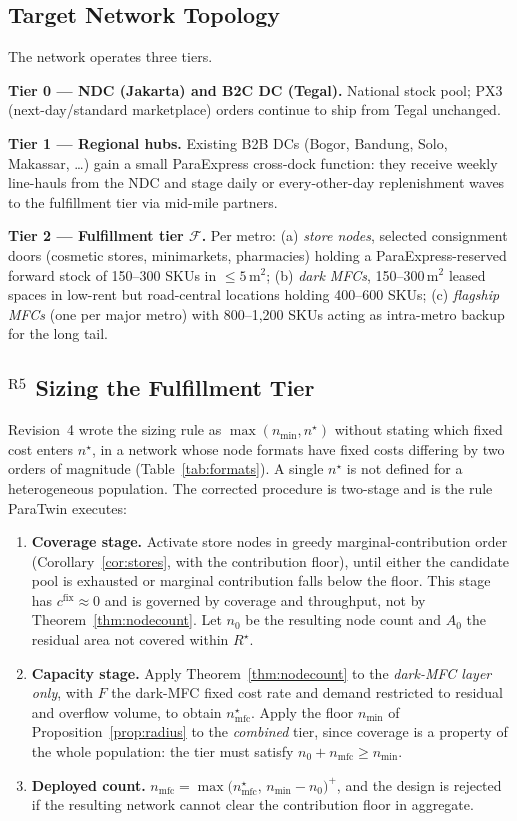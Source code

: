 \subsection{Target Network Topology}
The network operates three tiers.

\textbf{Tier 0 --- NDC (Jakarta) and B2C DC (Tegal).} National stock pool; PX3 (next-day/standard marketplace) orders continue to ship from Tegal unchanged.

\textbf{Tier 1 --- Regional hubs.} Existing B2B DCs (Bogor, Bandung, Solo, Makassar, \dots) gain a small ParaExpress cross-dock function: they receive weekly line-hauls from the NDC and stage daily or every-other-day replenishment waves to the fulfillment tier via mid-mile partners.

\textbf{Tier 2 --- Fulfillment tier $\mathcal{F}$.} Per metro: (a) \emph{store nodes}, selected consignment doors (cosmetic stores, minimarkets, pharmacies) holding a ParaExpress-reserved forward stock of 150--300 SKUs in $\le5$\,m$^2$; (b) \emph{dark MFCs}, 150--300\,m$^2$ leased spaces in low-rent but road-central locations holding 400--600 SKUs; (c) \emph{flagship MFCs} (one per major metro) with 800--1,200 SKUs acting as intra-metro backup for the long tail.

\subsection{$^{\mathrm{R5}}$ Sizing the Fulfillment Tier}\label{sec:sizing}

Revision~4 wrote the sizing rule as $\max(n_{\min},n^\star)$ without stating which fixed cost enters $n^\star$, in a network whose node formats have fixed costs differing by two orders of magnitude (Table~\ref{tab:formats}). A single $n^\star$ is not defined for a heterogeneous population. The corrected procedure is two-stage and is the rule ParaTwin executes:

\begin{enumerate}
\item \textbf{Coverage stage.} Activate store nodes in greedy marginal-contribution order (Corollary~\ref{cor:stores}, with the contribution floor), until either the candidate pool is exhausted or marginal contribution falls below the floor. This stage has $c^{\mathrm{fix}}\approx0$ and is governed by coverage and throughput, not by Theorem~\ref{thm:nodecount}. Let $n_0$ be the resulting node count and $A_0$ the residual area not covered within $R^\star$.
\item \textbf{Capacity stage.} Apply Theorem~\ref{thm:nodecount} to the \emph{dark-MFC layer only}, with $F$ the dark-MFC fixed cost rate and demand restricted to residual and overflow volume, to obtain $n^\star_{\mathrm{mfc}}$. Apply the floor $n_{\min}$ of Proposition~\ref{prop:radius} to the \emph{combined} tier, since coverage is a property of the whole population: the tier must satisfy $n_0+n_{\mathrm{mfc}}\ge n_{\min}$.
\item \textbf{Deployed count.} $n_{\mathrm{mfc}}=\max\bigl(n^\star_{\mathrm{mfc}},\,n_{\min}-n_0\bigr)^{+}$, and the design is rejected if the resulting network cannot clear the contribution floor in aggregate.
\end{enumerate}

